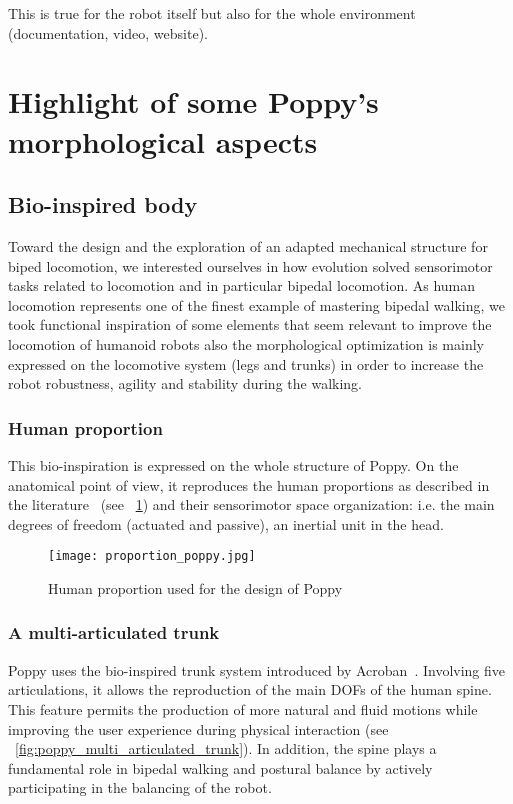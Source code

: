 This is true for the robot itself but also for the whole environment (documentation, video, website).


\section{Highlight of some Poppy's morphological aspects}


\subsection{Bio-inspired body} %
Toward the design and the exploration of an adapted mechanical structure for biped locomotion, we interested ourselves in how evolution solved sensorimotor tasks related to locomotion and in particular bipedal locomotion. As human locomotion represents one of the finest example of mastering bipedal walking, we took functional inspiration of some elements that seem relevant to improve the locomotion of humanoid robots also the morphological optimization is mainly expressed on the locomotive system (legs and trunks) in order to increase the robot robustness, agility and stability during the walking.

\subsubsection{Human proportion} %
This bio-inspiration is expressed on the whole structure of Poppy. On the anatomical point of view, it reproduces the human proportions as described in the literature~\cite{dufour2005biomecanique}  (see \figurename~\ref{fig:proportion_poppy}) and their sensorimotor space organization: i.e. the main degrees of freedom (actuated and passive), an inertial unit in the head.

\begin{figure}[]
    \centering
    \texttt{[image: proportion\_poppy.jpg]}
    \caption{Human proportion used for the design of Poppy~\cite{dufour2005biomecanique}}
    \label{fig:proportion_poppy}
\end{figure}

\subsubsection{A multi-articulated trunk} %

Poppy uses the bio-inspired trunk system introduced by Acroban~\cite{ly2010}. Involving five articulations, it allows the reproduction of the main DOFs of the human spine. This feature permits the production of more natural and fluid motions while improving the user experience during physical interaction (see \figurename~\ref{fig:poppy_multi_articulated_trunk}). In addition, the spine plays a fundamental role in bipedal walking and postural balance by actively participating in the balancing of the robot.

